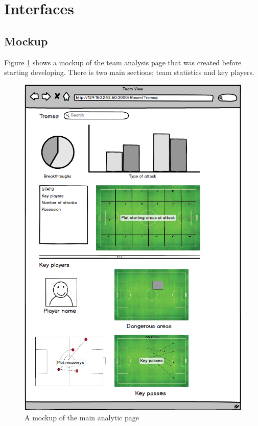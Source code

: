 
\section{Interfaces}

\subsection{Mockup}

Figure \ref{fig:mockup} shows a mockup of the team analysis page that was created before starting developing. There is two main sections; team statistics and key players.

\begin{figure}[ht!]
\centering
\includegraphics[width=1\textwidth]{images/general/mockup.png}
\caption{A mockup of the main analytic page}
\label{fig:mockup}
\end{figure}


